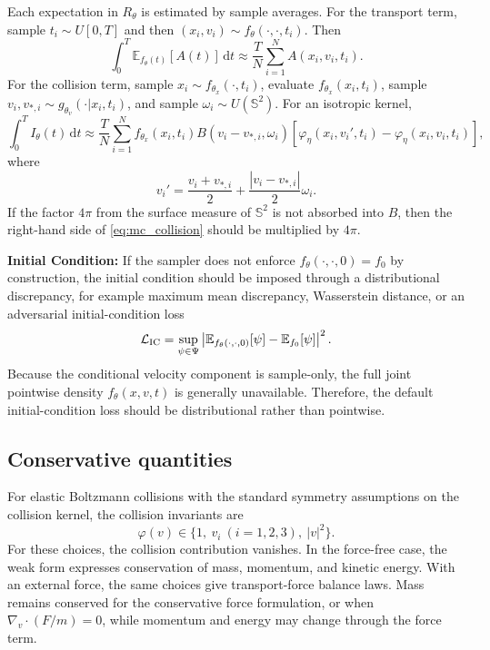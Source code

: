 \documentclass[11pt]{article}
\newcommand{\Sph}{\mathbb{S}^{2}}
\newcommand{\dd}{\,\mathrm{d}}
\newcommand{\E}{\mathbb{E}}
\newcommand{\ph}{\varphi}
\theoremstyle{plain}
\begin{document}
Each expectation in $R_\theta$ is estimated by sample averages. For the transport term, sample $t_i\sim U[0,T]$ and then $(x_i,v_i)\sim f_\theta(\cdot,\cdot,t_i)$. Then
\begin{equation}
\int_0^T \E_{f_\theta(t)}[A(t)]\dd t
\approx
\frac{T}{N}\sum_{i=1}^N A(x_i,v_i,t_i).
\label{eq:mc_time}
\end{equation}
For the collision term, sample $x_i\sim f_{\theta_x}(\cdot,t_i)$, evaluate $f_{\theta_x}(x_i,t_i)$, sample $v_i,v_{*,i}\sim g_{\theta_v}(\cdot|x_i,t_i)$, and sample $\omega_i\sim U(\Sph)$. For an isotropic kernel,
\begin{equation}
\int_0^T I_\theta(t)\dd t
\approx
\frac{T}{N}\sum_{i=1}^N
f_{\theta_x}(x_i,t_i)
B(v_i-v_{*,i},\omega_i)
\left[\ph_\eta(x_i,v_i',t_i)-\ph_\eta(x_i,v_i,t_i)\right],
\label{eq:mc_collision}
\end{equation}
where
\[
v_i'=\frac{v_i+v_{*,i}}{2}+\frac{|v_i-v_{*,i}|}{2}\omega_i.
\]
If the factor $4\pi$ from the surface measure of $\Sph$ is not absorbed into $B$, then the right-hand side of \eqref{eq:mc_collision} should be multiplied by $4\pi$.

\textbf{Initial Condition:}
If the sampler does not enforce $f_\theta(\cdot,\cdot,0)=f_0$ by construction, the initial condition should be imposed through a distributional discrepancy, for example maximum mean discrepancy, Wasserstein distance, or an adversarial initial-condition loss
\[
\mathcal L_{\rm IC}
=
\sup_{\psi\in\Psi}
\left|\E_{f_\theta(\cdot,\cdot,0)}[\psi]-\E_{f_0}[\psi]\right|^2.
\]
Because the conditional velocity component is sample-only, the full joint pointwise density $f_\theta(x,v,t)$ is generally unavailable. Therefore, the default initial-condition loss should be distributional rather than pointwise.

\subsection{Conservative quantities}

For elastic Boltzmann collisions with the standard symmetry assumptions on the collision kernel, the collision invariants are
\[
\ph(v)\in\{1,\ v_i\ (i=1,2,3),\ |v|^2\}.
\]
For these choices, the collision contribution vanishes. In the force-free case, the weak form expresses conservation of mass, momentum, and kinetic energy. With an external force, the same choices give transport-force balance laws. Mass remains conserved for the conservative force formulation, or when $\nabla_v\cdot(F/m)=0$, while momentum and energy may change through the force term.
\end{document}
